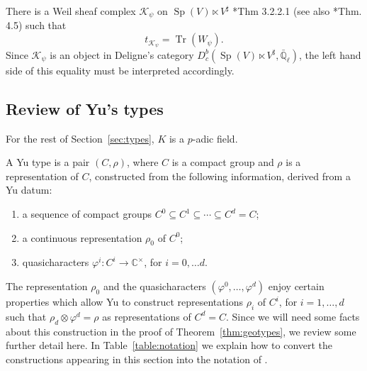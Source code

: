 \documentclass[10pt]{amsart}
\makeatletter
\theoremstyle{plain}
\theoremstyle{definition}
\newcommand{\CC}{{\mathbb{C}}}
\newcommand{\EE}{\mathbb{\bar Q}_\ell}
\DeclareMathOperator{\trace}{Tr}
\newcommand{\trFrob}[1]{t_{#1}}
\newcommand{\cs}[1]{{\mathcal{#1}}}
\newcommand{\labitem}[2]{
\def\@itemlabel{\textbf{#1}}
\item
\def\@currentlabel{#1}\label{#2}}
\newcommand{\Sp}{{\operatorname{Sp}}}
\makeatother
\begin{document}
There is a Weil sheaf complex $\cs{K}_\psi$ on $\Sp(V)\ltimes V^\sharp$ \cite{gurevich-hadani:07a}*{Thm 3.2.2.1} (see also \cite{gurevich-hadani:11a}*{Thm. 4.5}) such that 
\begin{equation}
\trFrob{\cs{K}_\psi} = \trace(W_\psi).
\end{equation}
%
Since $\cs{K}_\psi$ is an object in Deligne's category $D^b_c(\Sp(V)\ltimes V^\sharp,\EE)$, the left hand side of this equality must be interpreted accordingly.

\subsection{Review of Yu's types}\label{ssec:review}

For the rest of Section~\ref{sec:types}, $K$ is a $p$-adic field.


A Yu type is a pair $(C,\rho)$, where $C$ is a compact group and $\rho$ is a representation of $C$,  constructed from the following information, derived from a Yu datum:
\begin{enumerate}
\labitem{Y0}{Y0} a sequence of compact groups $C^0 \subseteq C^1 \subseteq \cdots \subseteq C^d= C$;
\labitem{Y1}{Y1} a continuous representation $\rho_0$ of $C^0$;
\labitem{Y2}{Y2} quasicharacters $\varphi^i : C^i \to \CC^\times$, for $i=0, \ldots d$.
\end{enumerate}
%
The representation $\rho_0$ and the quasicharacters $(\varphi^0, \ldots , \varphi^d)$ enjoy certain properties which allow Yu to construct representations $\rho_i$ of $C^i$, for $i=1, \ldots, d$ such that $\rho_d \otimes \varphi^d = \rho$ as representations of $C^d = C$.
%
Since we will need some facts about this construction in the proof of Theorem~\ref{thm:geotypes}, we review some further detail here.
In Table~\ref{table:notation} we explain how to convert the constructions appearing in this section into the notation of \cite{yu:01a}.
\end{document}
